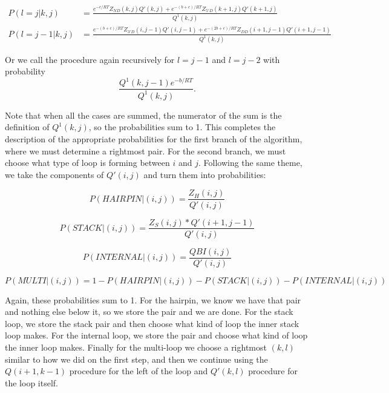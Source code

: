 \begin{equation}
\begin{split}
P(l = j | k, j) &= \frac{e^{-c/RT}Z_{ND}(k, j)Q'(k,j) + e^{-(b+c)/RT}Z_{5'D}(k+1, j)Q'(k+1, j)}{Q^1(k,j)} \\
P(l = j-1 | k, j) &= \frac{e^{-(b+c)/RT}Z_{3'D}(i, j-1)Q'(i, j-1) + e^{-(2b + c)/RT}Z_{DD}(i+1, j-1)Q'(i+1, j-1)}{Q^1(k, j)}
\end{split}
\end{equation}

Or we call the procedure again recursively for $l = j-1$ and $l=j-2$ with probability 
\begin{equation}
\frac{Q^1(k, j-1)e^{-b/RT}}{Q^1(k, j)}. 
\end{equation} 

Note that when all the cases are summed, the numerator of the sum is
the definition of $Q^1(k, j)$, so the probabilities sum to 1. This
completes the description of the appropriate probabilities for the
first branch of the algorithm, where we must determine a rightmost
pair. For the second branch, we must choose what type of loop is
forming between $i$ and $j$. Following the same theme, we take the
components of $Q'(i,j)$ and turn them into probabilities:

\begin{equation}
P(HAIRPIN | (i,j)) = \frac{Z_H(i, j)}{Q'(i, j)}
\end{equation}

\begin{equation}
P(STACK | (i,j)) = \frac{Z_S(i,j)*Q'(i+1, j-1)}{Q'(i,j)}
\end{equation}

\begin{equation}
P(INTERNAL | (i, j)) = \frac{QBI(i, j)}{Q'(i, j)}
\end{equation}

\begin{equation} 
P(MULTI | (i,j)) = 1 - P(HAIRPIN | (i,j)) - P(STACK | (i,j)) - P(INTERNAL | (i, j))
\end{equation}

Again, these probabilities sum to 1. For the hairpin, we know we have
that pair and nothing else below it, so we store the pair and we are
done. For the stack loop, we store the stack pair and then choose what
kind of loop the inner stack loop makes. For the internal loop, we
store the pair and choose what kind of loop the inner loop
makes. Finally for the multi-loop we choose a rightmost $(k,l)$
similar to how we did on the first step, and then we continue using
the $Q(i+1,k-1)$ procedure for the left of the loop and $Q'(k,l)$
procedure for the loop itself.


